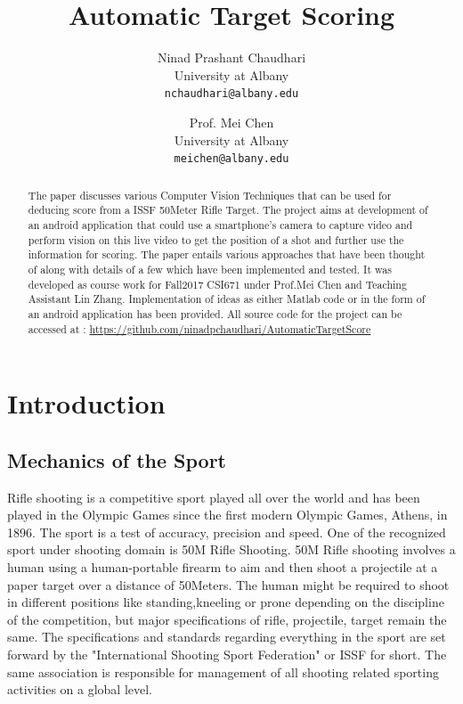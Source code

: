 \documentclass[10pt,twocolumn,letterpaper]{article}
\begin{document}
\title{Automatic Target Scoring}

\author{Ninad Prashant Chaudhari\\
University at Albany\\
{\tt\small nchaudhari@albany.edu}
\and
Prof. Mei Chen\\
University at Albany\\
{\tt\small meichen@albany.edu}
}

\maketitle

\begin{abstract}
The paper discusses various Computer Vision Techniques that can be used for deducing score from a ISSF 50Meter Rifle Target. The project aims at development of an android application that could use a smartphone's camera to capture video and perform vision on this live video to get the position of a shot and further use the information for scoring. The paper entails various approaches that have been thought of along with details of a few which have been implemented and tested. It was developed as course work for Fall2017 CSI671 under Prof.Mei Chen and Teaching Assistant Lin Zhang. Implementation of ideas as either Matlab code or in the form of an android application has been provided. All source code for the project can be accessed at : \url{https://github.com/ninadpchaudhari/AutomaticTargetScore} 
\end{abstract}

\section{Introduction}
\subsection{Mechanics of the Sport}
Rifle shooting is a competitive sport played all over the world and has been played in the Olympic Games since the first modern Olympic Games, Athens, in 1896\cite{ISSFHistory}. The sport is a test of accuracy, precision and speed. One of the recognized sport under shooting domain is 50M Rifle Shooting. 50M Rifle shooting involves a human using a human-portable firearm to aim and then shoot a projectile at a paper target over a distance of 50Meters. The human might be required to shoot in different positions like standing,kneeling or prone depending on the discipline of the competition, but major specifications of rifle, projectile, target remain the same.  The specifications and standards regarding everything in the sport are set forward by the "International Shooting Sport Federation" or ISSF for short. The same association is responsible for management of all shooting related sporting activities on a global level.
\end{document}

